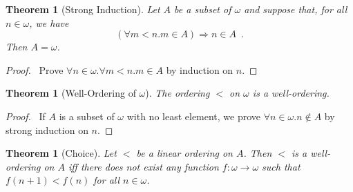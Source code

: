 \documentclass{article}
\let\qed\relax
\newtheorem{theorem}[axiom]{Theorem}
\theoremstyle{definition}
\begin{document}
    \begin{theorem}[Strong Induction]
        Let $A$ be a subset of $\omega$ and suppose that, for all $n \in \omega$, we have
        \[ (\forall m < n. m \in A) \Rightarrow n \in A \enspace . \]
        Then $A = \omega$.
    \end{theorem}

    \begin{proof}
        \pf\ Prove $\forall n \in \omega. \forall m < n. m \in A$ by induction on $n$. \qed
    \end{proof}
    
    \begin{theorem}[Well-Ordering of $\omega$]
        The ordering $<$ on $\omega$ is a well-ordering.
    \end{theorem}
    
    \begin{proof}
        \pf\ If $A$ is a subset of $\omega$ with no least element, we prove $\forall n \in \omega. n \notin A$
        by strong induction on $n$. \qed
    \end{proof}

    \begin{theorem}[Choice]
        Let $<$ be a linear ordering on $A$. Then $<$ is a well-ordering on $A$ iff there does not exist
        any function $f : \omega \rightarrow \omega$ such that $f(n+1) < f(n)$ for all $n \in \omega$.
    \end{theorem}
\end{document}
